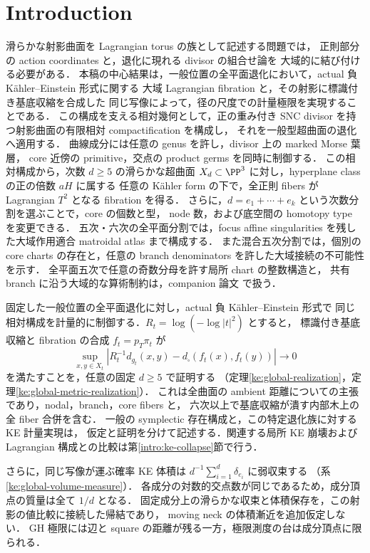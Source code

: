 \section{Introduction}

滑らかな射影曲面を Lagrangian torus の族として記述する問題では，
正則部分の action coordinates と，退化に現れる divisor の組合せ論を
大域的に結び付ける必要がある．
本稿の中心結果は，一般位置の全平面退化において，actual 負 Kähler--Einstein 形式に関する
大域 Lagrangian fibration と，その射影に標識付き基底収縮を合成した
同じ写像によって，径の尺度での計量極限を実現することである．
この構成を支える相対幾何として，正の重み付き SNC divisor を持つ射影曲面の有限相対 compactification を構成し，
それを一般型超曲面の退化へ適用する．
曲線成分には任意の genus を許し，divisor 上の marked Morse 葉層，
core 近傍の primitive，交点の product germs を同時に制御する．
この相対構成から，次数 $d\geq5$ の滑らかな超曲面
$X_d\subset\PP^3$ に対し，hyperplane class の正の倍数 $aH$ に属する
任意の Kähler form の下で，全正則 fibers が Lagrangian $T^2$ となる fibration を得る．
さらに，$d=e_1+\cdots+e_k$ という次数分割を選ぶことで，core の個数と型，
node 数，および底空間の homotopy type を変更できる．
五次・六次の全平面分割では，focus affine singularities を残した大域作用適合 matroidal atlas まで構成する．
また混合五次分割では，個別の core charts の存在と，任意の branch denominators を許した大域接続の不可能性を示す．
全平面五次で任意の奇数分母を許す局所 chart の整数構造と，
共有 branch に沿う大域的な算術制約は，companion 論文
\cite{QuinticArithmetic}で扱う．

固定した一般位置の全平面退化に対し，actual 負 Kähler--Einstein 形式で
同じ相対構成を計量的に制御する．$R_t=\log(-\log|t|^2)$ とすると，
標識付き基底収縮と fibration の合成 $f_t=p_T\pi_t$ が
\[
 \sup_{x,y\in X_t}
 \left|R_t^{-1}d_{g_t}(x,y)-d_\square(f_t(x),f_t(y))\right|\to0
\]
を満たすことを，任意の固定 $d\ge5$ で証明する
（定理\ref{ke:global-realization}，定理\ref{ke:global-metric-realization}）．
これは全曲面の ambient 距離についての主張であり，nodal，branch，core fibers と，
六次以上で基底収縮が潰す内部木上の全 fiber 合併を含む．
一般の symplectic 存在構成と，この特定退化族に対する KE 計量実現は，
仮定と証明を分けて記述する．関連する局所 KE 崩壊および
Lagrangian 構成との比較は第\ref{intro:ke-collapse}節で行う．

さらに，同じ写像が運ぶ確率 KE 体積は
$d^{-1}\sum_{i=1}^d\delta_{e_i}$ に弱収束する
（系\ref{ke:global-volume-measure}）．
各成分の対数的交点数が同じであるため，成分頂点の質量は全て $1/d$ となる．
固定成分上の滑らかな収束と体積保存を，この射影の値比較に接続した帰結であり，
moving neck の体積漸近を追加仮定しない．
GH 極限には辺と square の距離が残る一方，極限測度の台は成分頂点に限られる．

